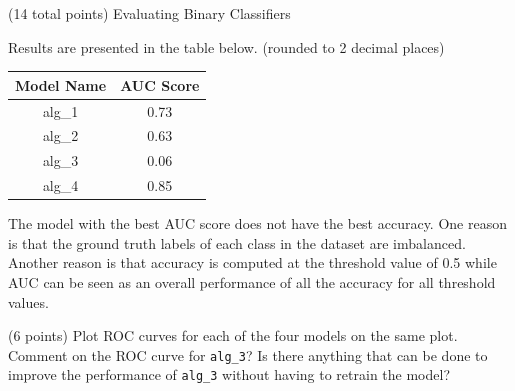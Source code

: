 \documentclass[12pt]{article}
\begin{document}
\begin{question}{(14 total points) Evaluating Binary Classifiers}
\begin{subquestion}
\begin{answerbox}{15em}
Results are presented in the table below. (rounded to 2 decimal places)
\begin{center}
\begin{tabular}{|c|c|}
\hline
Model Name & AUC Score\\
\hline
alg\_1 & 0.73 \\
alg\_2 & 0.63 \\
alg\_3 & 0.06 \\
alg\_4 & 0.85 \\
\hline
\end{tabular}
\end{center}
The model with the best AUC score does not have the best accuracy. One reason is that the ground truth labels of each class in the dataset are imbalanced. Another reason is that accuracy is computed at the threshold value of 0.5 while AUC can be seen as an overall performance of all the accuracy for all threshold values.
\end{answerbox}



\end{subquestion}



%
%
\begin{subquestion}{(6 points) Plot ROC curves for each of the four models on the same plot.
Comment on the ROC curve for \texttt{alg\_3}?
Is there anything that can be done to improve the performance of \texttt{alg\_3} without having to retrain the model?\\
}



\end{subquestion}
\end{question}
\end{document}
